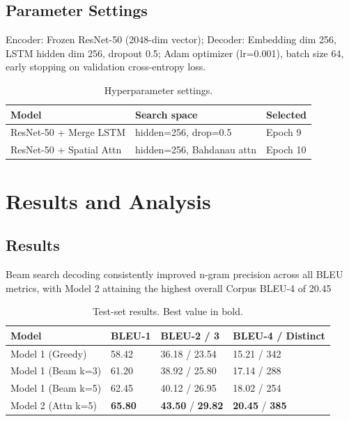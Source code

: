 \documentclass[conference]{IEEEtran}
\begin{document}
\subsection{Parameter Settings}
Encoder: Frozen ResNet-50 (2048-dim vector); Decoder: Embedding dim 256, LSTM hidden dim 256, dropout 0.5; Adam optimizer (lr=0.001), batch size 64, early stopping on validation cross-entropy loss.

\begin{table}[htbp]
\caption{Hyperparameter settings.}
\label{tab:hyperparameters}
\centering
\begin{tabular}{lll}
\toprule
\textbf{Model} & \textbf{Search space} & \textbf{Selected} \\
\midrule
ResNet-50 + Merge LSTM & hidden=256, drop=0.5 & Epoch 9 \\
ResNet-50 + Spatial Attn & hidden=256, Bahdanau attn & Epoch 10 \\
\bottomrule
\end{tabular}
\end{table}

\section{Results and Analysis}
\subsection{Results}
Beam search decoding consistently improved n-gram precision across all BLEU metrics, with Model 2 attaining the highest overall Corpus BLEU-4 of 20.45%

\begin{table}[htbp]
\caption{Test-set results. Best value in bold.}
\label{tab:results}
\centering
\begin{tabular}{llll}
\toprule
\textbf{Model} & \textbf{BLEU-1} & \textbf{BLEU-2 / 3} & \textbf{BLEU-4 / Distinct} \\
\midrule
Model 1 (Greedy) & 58.42 & 36.18 / 23.54 & 15.21 / 342 \\
Model 1 (Beam k=3) & 61.20 & 38.92 / 25.80 & 17.14 / 288 \\
Model 1 (Beam k=5) & 62.45 & 40.12 / 26.95 & 18.02 / 254 \\
Model 2 (Attn k=5) & \textbf{65.80} & \textbf{43.50} / \textbf{29.82} & \textbf{20.45} / \textbf{385} \\
\bottomrule
\end{tabular}
\end{table}
\end{document}

